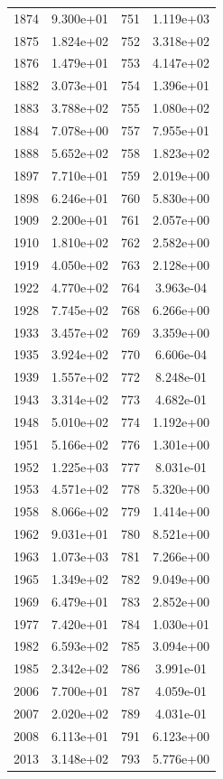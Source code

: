\documentclass[12pt]{article}
\begin{document}
\begin{longtable}{@{}cccc@{}}
1874 & 9.300e+01 & 751 & 1.119e+03 \\
1875 & 1.824e+02 & 752 & 3.318e+02 \\
1876 & 1.479e+01 & 753 & 4.147e+02 \\
1882 & 3.073e+01 & 754 & 1.396e+01 \\
1883 & 3.788e+02 & 755 & 1.080e+02 \\
1884 & 7.078e+00 & 757 & 7.955e+01 \\
1888 & 5.652e+02 & 758 & 1.823e+02 \\
1897 & 7.710e+01 & 759 & 2.019e+00 \\
1898 & 6.246e+01 & 760 & 5.830e+00 \\
1909 & 2.200e+01 & 761 & 2.057e+00 \\
1910 & 1.810e+02 & 762 & 2.582e+00 \\
1919 & 4.050e+02 & 763 & 2.128e+00 \\
1922 & 4.770e+02 & 764 & 3.963e-04 \\
1928 & 7.745e+02 & 768 & 6.266e+00 \\
1933 & 3.457e+02 & 769 & 3.359e+00 \\
1935 & 3.924e+02 & 770 & 6.606e-04 \\
1939 & 1.557e+02 & 772 & 8.248e-01 \\
1943 & 3.314e+02 & 773 & 4.682e-01 \\
1948 & 5.010e+02 & 774 & 1.192e+00 \\
1951 & 5.166e+02 & 776 & 1.301e+00 \\
1952 & 1.225e+03 & 777 & 8.031e-01 \\
1953 & 4.571e+02 & 778 & 5.320e+00 \\
1958 & 8.066e+02 & 779 & 1.414e+00 \\
1962 & 9.031e+01 & 780 & 8.521e+00 \\
1963 & 1.073e+03 & 781 & 7.266e+00 \\
1965 & 1.349e+02 & 782 & 9.049e+00 \\
1969 & 6.479e+01 & 783 & 2.852e+00 \\
1977 & 7.420e+01 & 784 & 1.030e+01 \\
1982 & 6.593e+02 & 785 & 3.094e+00 \\
1985 & 2.342e+02 & 786 & 3.991e-01 \\
2006 & 7.700e+01 & 787 & 4.059e-01 \\
2007 & 2.020e+02 & 789 & 4.031e-01 \\
2008 & 6.113e+01 & 791 & 6.123e+00 \\
2013 & 3.148e+02 & 793 & 5.776e+00 \\

\end{longtable}
\end{document}
